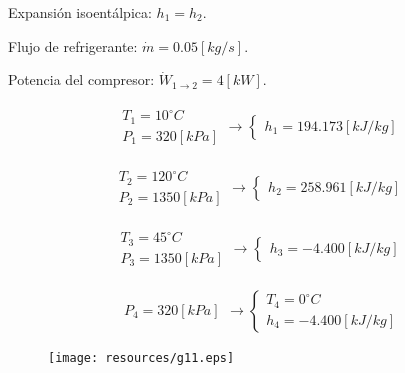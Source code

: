 \documentclass[letter,10pt]{article}
\begin{document}
\begin{enumerate}
Expansión isoentálpica: $h_1 = h_2$.

Flujo de refrigerante: $\dot{m}=0.05[kg/s]$.

Potencia del compresor: $\dot{W}_{1\rightarrow2}=4[kW]$.

\begin{eqnarray*}
    \begin{array}{c}
        T_1 = 10^\circ C \\
        P_1 = 320[kPa]
    \end{array}
    \rightarrow
    \begin{cases}
        h_1 = 194.173[kJ/kg]
    \end{cases}
\end{eqnarray*}

\begin{eqnarray*}
    \begin{array}{c}
        T_2 = 120^\circ C \\
        P_2 = 1350[kPa]
    \end{array}
    \rightarrow
    \begin{cases}
        h_2 = 258.961[kJ/kg]
    \end{cases}
\end{eqnarray*}

\begin{eqnarray*}
    \begin{array}{c}
        T_3 = 45^\circ C \\
        P_3 = 1350[kPa]
    \end{array}
    \rightarrow
    \begin{cases}
        h_3 = -4.400[kJ/kg]
    \end{cases}
\end{eqnarray*}

\begin{eqnarray*}
    \begin{array}{c}
        P_4 = 320[kPa]
    \end{array}
    \rightarrow
    \begin{cases}
        T_4 = 0^\circ C \\
        h_4 = -4.400[kJ/kg]
    \end{cases}
\end{eqnarray*}

\begin{figure}[H]
\centering
\texttt{[image: resources/g11.eps]}
\end{figure}


\end{enumerate}
\end{document}
